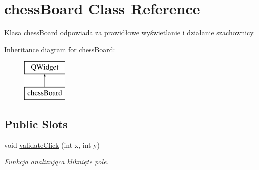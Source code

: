 \hypertarget{classchess_board}{}\section{chess\+Board Class Reference}
\label{classchess_board}


Klasa \hyperlink{classchess_board}{chess\+Board} odpowiada za prawidłowe wyświetlanie i działanie szachownicy.  


Inheritance diagram for chess\+Board\+:\begin{figure}[H]
\begin{center}
\leavevmode
\includegraphics[height=2.000000cm]{classchess_board}
\end{center}
\end{figure}
\subsection*{Public Slots}
\begin{DoxyCompactItemize}
\item 
void \hyperlink{classchess_board_aa867893a425aa624b21e9c8185198d3e}{validate\+Click} (int x, int y)
\begin{DoxyCompactList}\small\item\em Funkcja analizująca kliknięte pole. \end{DoxyCompactList}\end{DoxyCompactItemize}
